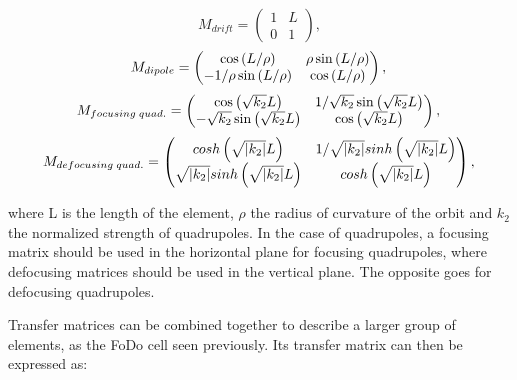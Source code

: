 \begin{equation}
    M_{drift} = \begin{pmatrix}
                    1 & L \\
                    0 & 1 
                \end{pmatrix},
\end{equation}
\begin{equation}
    M_{dipole} = \begin{pmatrix}
                    \cos\left(L/\rho\right) & \rho \sin\left(L/\rho\right) \\
                    -1/\rho \sin\left(L/\rho\right) & \cos\left(L/\rho\right)
                 \end{pmatrix}, \\
\end{equation}
\begin{equation}
    M_{focusing\;quad.} = \begin{pmatrix}
                             \cos\left(\sqrt{k_2}L\right) & 1/\sqrt{k_2} \sin\left(\sqrt{k_2}L\right) \\
                             -\sqrt{k_2}\sin\left(\sqrt{k_2}L\right) & \cos\left(\sqrt{k_2}L\right)
                          \end{pmatrix},\\
\end{equation}
\begin{equation}
    M_{defocusing\;quad.} = \begin{pmatrix}
                        cosh\left(\sqrt{|k_2|}L \right) & 1/\sqrt{|k_2|} sinh\left(\sqrt{|k_2|} L\right) \\
                        \sqrt{|k_2|} sinh\left(\sqrt{|k_2|} L\right) & cosh\left(\sqrt{|k_2|} L \right)
                            \end{pmatrix},\\
\end{equation}

where L is the length of the element, $\rho$ the radius of curvature of the orbit and $k_2$ the
normalized strength of quadrupoles. In the case of quadrupoles, a focusing matrix should be used in
the horizontal plane for focusing quadrupoles, where defocusing matrices should be used in the
vertical plane. The opposite goes for defocusing quadrupoles.

Transfer matrices can be combined together to describe a larger group of elements, as the FoDo cell
seen previously. Its transfer matrix can then be expressed as:

